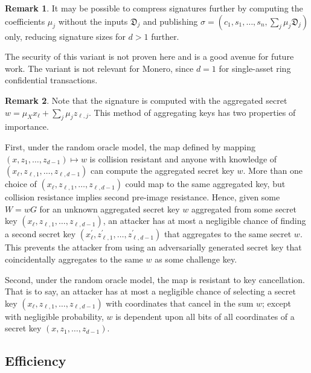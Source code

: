 \documentclass{article}
\theoremstyle{plain}
\theoremstyle{definition}
\newtheorem{remark}{Remark}[section]
\begin{document}
\begin{remark}
It may be possible to compress signatures further by  computing the coefficients $\mu_j$ without the inputs $\mathfrak{D}_j$ and publishing $\sigma = (c_1, s_1, \ldots, s_n, \sum_j \mu_j \mathfrak{D}_j)$ only, reducing signature sizes for $d > 1$ further. 

The security of this variant is not proven here and is a good avenue for future work. The variant is not relevant for Monero, since $d=1$ for single-asset ring confidential transactions.
\end{remark}

\begin{remark}


Note that the signature is computed with the aggregated secret $w = \mu_X x_\ell + \sum_j \mu_j z_{\ell,j}$. This method of aggregating keys has two properties of importance.

First, under the random oracle model, the map defined by mapping $(x, z_1, \ldots, z_{d-1}) \mapsto w$ is collision resistant and anyone with knowledge of $(x_\ell, z_{\ell,1}, \ldots, z_{\ell,d-1})$ can compute the aggregated secret key $w$. More than one choice of $(x_\ell, z_{\ell,1}, \ldots, z_{\ell,d-1})$ could map to the same aggregated key, but collision resistance implies second pre-image resistance. Hence, given some $W = wG$ for an unknown aggregated secret key $w$ aggregated from some secret key $(x_\ell, z_{\ell,1}, \ldots, z_{\ell,d-1})$, an attacker has at most a negligible chance of finding a second secret key $(x_\ell^\prime, z_{\ell,1}^\prime, \ldots, z_{\ell,d-1}^\prime)$ that aggregates to the same secret $w$. This prevents the attacker from using an adversarially generated secret key that coincidentally aggregates to the same $w$ as some challenge key.


Second, under the random oracle model, the map is resistant to key cancellation. That is to say, an attacker has at most a negligible chance of selecting a secret key $(x_\ell, z_{\ell, 1}, \ldots, z_{\ell, d-1})$ with coordinates that cancel in the sum $w$; except with negligible probability, $w$ is dependent upon all bits of all coordinates of a secret key $(x, z_1, \ldots, z_{d-1})$. 

\end{remark}

\subsection{Efficiency}
\end{document}
